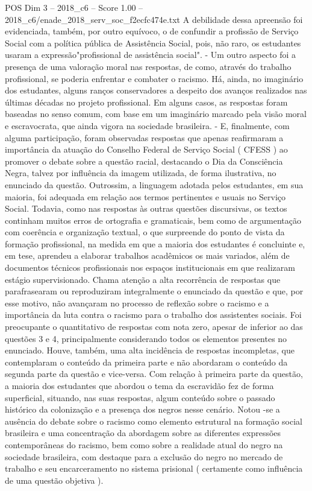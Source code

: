 \begin{textsample}{POS Dim 3 – 2018\_c6 – Score 1.00 – 2018\_c6/enade\_2018\_serv\_soc\_f2ecfc474e.txt}
A debilidade dessa apreensão foi evidenciada, também, por outro equívoco, o de confundir a profissão de Serviço Social com a política pública de Assistência Social, pois, não raro, os estudantes usaram a expressão"profissional de assistência social". - Um outro aspecto foi a presença de uma valoração moral nas respostas, de como, através do trabalho profissional, se poderia enfrentar e combater o racismo.
Há, ainda, no imaginário dos estudantes, alguns ranços conservadores a despeito dos avanços realizados nas últimas décadas no projeto profissional.
Em alguns casos, as respostas foram baseadas no senso comum, com base em um imaginário marcado pela visão moral e escravocrata, que ainda vigora na sociedade brasileira. - E, finalmente, com alguma participação, foram observadas respostas que apenas reafirmaram a importância da atuação do Conselho Federal de Serviço Social ( CFESS ) ao promover o debate sobre a questão racial, destacando o Dia da Consciência Negra, talvez por influência da imagem utilizada, de forma ilustrativa, no enunciado da questão.
Outrossim, a linguagem adotada pelos estudantes, em sua maioria, foi adequada em relação aos termos pertinentes e usuais no Serviço Social.
Todavia, como nas respostas às outras questões discursivas, os textos continham muitos erros de ortografia e gramaticais, bem como de argumentação com coerência e organização textual, o que surpreende do ponto de vista da formação profissional, na medida em que a maioria dos estudantes é concluinte e, em tese, aprendeu a elaborar trabalhos acadêmicos os mais variados, além de documentos técnicos profissionais nos espaços institucionais em que realizaram estágio supervisionado.
Chama atenção a alta recorrência de respostas que parafrasearam ou reproduziram integralmente o enunciado da questão e que, por esse motivo, não avançaram no processo de reflexão sobre o racismo e a importância da luta contra o racismo para o trabalho dos assistentes sociais.
Foi preocupante o quantitativo de respostas com nota zero, apesar de inferior ao das questões 3 e 4, principalmente considerando todos os elementos presentes no enunciado.
Houve, também, uma alta incidência de respostas incompletas, que contemplaram o conteúdo da primeira parte e não abordaram o conteúdo da segunda parte da questão e vice-versa.
Com relação à primeira parte da questão, a maioria dos estudantes que abordou o tema da escravidão fez de forma superficial, situando, nas suas respostas, algum conteúdo sobre o passado histórico da colonização e a presença dos negros nesse cenário.
Notou -se a ausência do debate sobre o racismo como elemento estrutural na formação social brasileira e uma concentração da abordagem sobre as diferentes expressões contemporâneas do racismo, bem como sobre a realidade atual do negro na sociedade brasileira, com destaque para a exclusão do negro no mercado de trabalho e seu encarceramento no sistema prisional ( certamente como influência de uma questão objetiva ).

\end{textsample}
